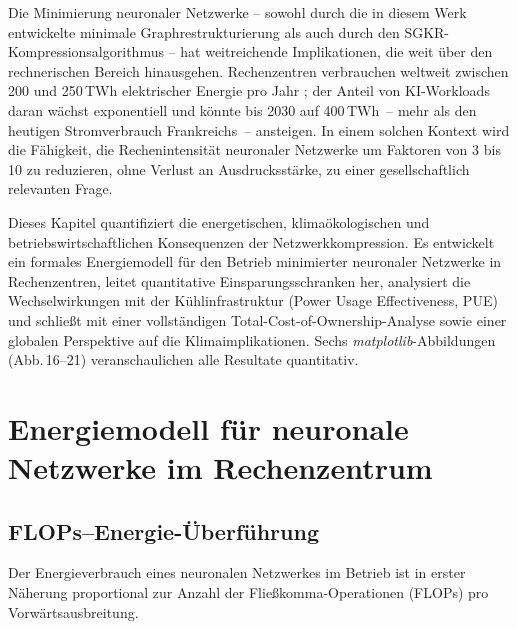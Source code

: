 ﻿\documentclass[12pt, a4paper, openany]{report}
\begin{document}
Die Minimierung neuronaler Netzwerke -- sowohl durch die in diesem Werk
entwickelte minimale Graphrestrukturierung als auch durch den
SGKR-Kompressions\-algorithmus -- hat weitreichende Implikationen, die weit
über den rechnerischen Bereich hinausgehen.  Rechenzentren verbrauchen
weltweit zwischen 200 und 250\,TWh elektrischer Energie pro Jahr
\citep{iea2024}; der Anteil von KI-Workloads daran
wächst exponentiell und könnte bis 2030 auf 400\,TWh~-- mehr als den
heutigen Stromverbrauch Frankreichs~-- ansteigen.  In einem solchen Kontext
wird die Fähigkeit, die Rechenintensität neuronaler Netzwerke um Faktoren
von 3 bis 10 zu reduzieren, ohne Verlust an Ausdrucksstärke, zu einer
gesellschaftlich relevanten Frage.

Dieses Kapitel quantifiziert die energetischen, klimaökologischen und
betriebswirtschaftlichen Konsequenzen der Netzwerkkompression.  Es entwickelt
ein formales Energiemodell für den Betrieb minimierter neuronaler Netzwerke
in Rechenzentren, leitet quantitative Einsparungsschranken her, analysiert
die Wechselwirkungen mit der Kühlinfrastruktur (Power Usage Effectiveness,
PUE) und schließt mit einer vollständigen Total-Cost-of-Ownership-Analyse
sowie einer globalen Perspektive auf die Klimaimplikationen.  Sechs
\textit{matplotlib}-Abbildungen (Abb.\,16--21) veranschaulichen alle
Resultate quantitativ.

\section{Energiemodell für neuronale Netzwerke im Rechenzentrum}
\label{sec:energy_model}

\subsection{FLOPs--Energie-Überführung}

Der Energieverbrauch eines neuronalen Netzwerkes im Betrieb ist in erster
Näherung proportional zur Anzahl der Fließkomma-Operationen (FLOPs) pro
Vorwärtsausbreitung.
\end{document}
